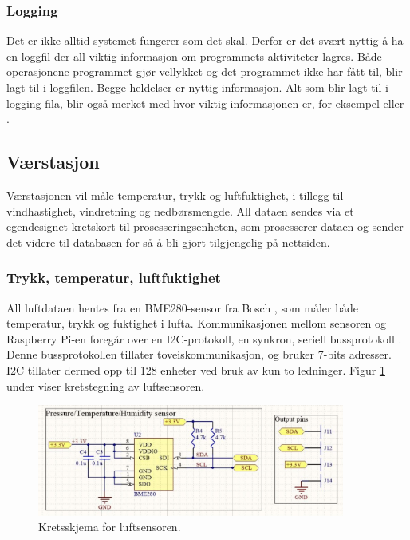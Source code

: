 \subsubsection{Logging}\label{sec:impl:programvare:logging}
Det er ikke alltid systemet fungerer som det skal.
Derfor er det svært nyttig å ha en loggfil der all viktig informasjon om programmets aktiviteter lagres. 
Både operasjonene programmet gjør vellykket og det programmet ikke har fått til, blir lagt til i loggfilen. 
Begge heldelser er nyttig informasjon. 
Alt som blir lagt til i logging-fila, blir også merket med hvor viktig informasjonen er, for eksempel  eller . 

\subsection{Værstasjon}\label{sec:impl:vaer}

Værstasjonen vil måle temperatur, trykk og luftfuktighet, i tillegg til vindhastighet, vindretning og nedbørsmengde. 
All dataen sendes via et egendesignet kretskort til prosesseringsenheten, som prosesserer dataen og sender det videre til databasen for så å bli gjort tilgjengelig på nettsiden.


\subsubsection{Trykk, temperatur, luftfuktighet}\label{sec:impl:vaer:ttl}

All luftdataen hentes fra en BME280-sensor fra Bosch \cite{bme280}, som måler både temperatur, trykk og fuktighet i lufta. 
Kommunikasjonen mellom sensoren og Raspberry Pi-en foregår over en I2C-protokoll, en synkron, seriell bussprotokoll \cite{i2c}. 
Denne bussprotokollen tillater toveiskommunikasjon, og bruker 7-bits adresser. 
I2C tillater dermed opp til 128 enheter ved bruk av kun to ledninger. 
Figur \ref{fig:luftsensor_krets-} under viser kretstegning av luftsensoren.

\begin{figure}[H]
    \centering
    \includegraphics[width=0.9\textwidth]{implementering/luftsensor_krets.png}
    \caption{Kretsskjema for luftsensoren.}
    \label{fig:luftsensor_krets-}
\end{figure}

